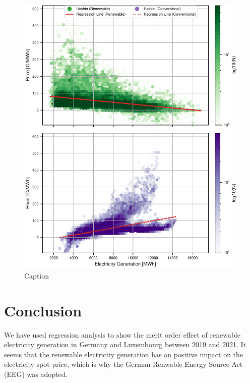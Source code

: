 \documentclass{article}
\begin{document}

\begin{figure}[h]
    \centering
    \includegraphics[width=\columnwidth]{doc/fig/ren_vs_con_regression_separate.pdf}
    \caption{Caption}
    \label{fig:ren_vs_con_regression}
\end{figure}



\section{Conclusion}

We have used regression analysis to show the merit order effect of renewable electricity generation in Germany and Luxembourg between 2019 and 2021.
It seems that the renewable electricity generation has an positive impact on the electricity spot price, which is why the German Renwable Energy Source Act (EEG) was adopted. 



\end{document}
